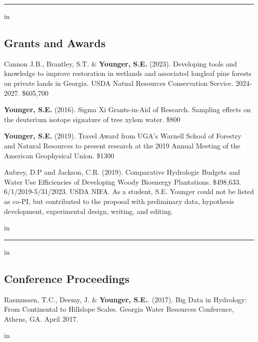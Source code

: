 \documentclass[10pt,letterpaper]{article}
\begin{document}
	\hrule
	\vspace{-0.4em}
	 in
	\subsection*{Grants and Awards}
	
	\begin{hangparas}{.25in}{1}
		
		Cannon J.B., Brantley, S.T. \& \textbf{Younger, S.E.} (2023). Developing tools and knowledge to improve restoration in wetlands and associated longleaf pine forests on private lands in Georgia. USDA Natual Resources Conservation Service. 2024-2027. \$605,700
		
		\textbf{Younger, S.E.} (2016). Sigma Xi Grants-in-Aid of Research. Sampling effects on the deuterium isotope signature of tree xylem water. \$800
		
		\textbf{Younger, S.E.} (2019). Travel Award from UGA's Warnell School of Forestry and Natural Resources to present research at the 2019 Annual Meeting of the American Geophysical Union. \$1300
		
		Aubrey, D.P and Jackson, C.R. (2019). Comparative Hydrologic Budgets and Water Use Efficiencies of Developing Woody Bioenergy Plantations. \$498,633. 6/1/2019-5/31/2023. USDA NIFA. As a student, S.E. Younger could not be listed as co-PI, but contributed to the proposal with preliminary data, hypothesis development, experimental design, writing, and editing.
		
		\vspace{-0.4em}
		 in
		
	\end{hangparas}
	
	\hrule
	\vspace{-0.4em}
	 in
	\subsection*{Conference Proceedings}
	
	\begin{hangparas}{.25in}{1}
		
		Rasmussen, T.C., Deemy, J. \& \textbf{Younger, S.E.}. (2017). Big Data in Hydrology: From Continental to Hillslope Scales. Georgia Water Resources Conference, Athens, GA. April 2017.
		
	\end{hangparas}
	
	 in
	
	
\end{document}
